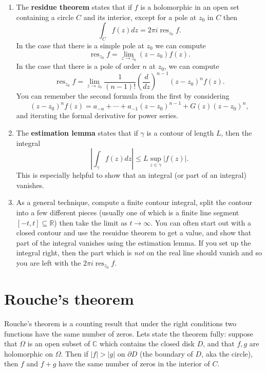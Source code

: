 \documentclass[10pt]{article}
\DeclareMathOperator{\res}{res}
\begin{document}
\begin{enumerate}
	\item The \textbf{residue theorem} states that if $f$ is a holomorphic in an open set containing a circle $C$ and its interior, except for a pole at $z_0$ in $C$ then 
	\[ \int_C f(z) dz = 2\pi i \res_{z_0} f.\]
	In the case that there is a simple pole at $z_0$ we can compute
	\[ \res_{z_0} f = \lim_{z \rightarrow z_0} (z-z_0) f(z).\]
	In the case that there is a pole of order $n$ at $z_0$, we can compute
	\[ \res_{z_0} f = \lim_{z \rightarrow z_0} \frac{1}{(n-1)!} \left ( \frac{d}{dz}\right )^{n-1} (z-z_0)^n f(z).\]
	You can remember the second formula from the first by considering \[(z-z_0)^n f(z) = a_{-n} +  \cdots + a_{-1} (z-z_0)^{n-1} + G(z) (z-z_0)^n,\] and iterating the formal derivative for power series.
	
	\item The \textbf{estimation lemma} states that if $\gamma$ is a contour of length $L$, 
	then the integral \[ \left | \int_{\gamma} f(z) dz \right | \leq L \sup_{z \in \gamma} | f(z) |.\]
	This is especially helpful to show that an integral (or part of an integral) vanishes.
	
	\item As a general technique, compute a finite contour integral, split the contour into a few different pieces (usually one of which is a finite line segment $[-t,t] \subseteq \mathbb{R}$) then take the limit as $t \rightarrow \infty$.
	You can often start out with a closed contour and use the resuidue theorem to get a value, and show
	that part of the integral vanishes using the estimation lemma. If you set up the integral right, 
	then the part which is \emph{not} on the real line should vanish and so you are left with 
	the $2\pi i \res_{z_0} f$.
	
\end{enumerate}

\section{Rouche's theorem}

Rouche's theorem is a counting result that under the right conditions two functions have the same number of zeros.
Lets state the theorem fully:
suppose that $\Omega$ is an open subset of $\mathbb{C}$ which contains the closed disk $D$, and that $f,g$ 
are holomorphic on $\Omega$.
Then if $|f| > |g|$ on $\partial D$ (the boundary of $D$, aka the circle), then $f$ and $f+g$ have the same number of zeros 
in the interior of $C$.
\end{document}
